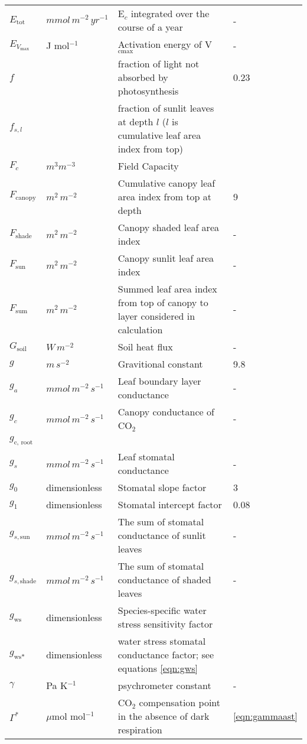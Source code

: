 \documentclass[10pt]{article}
\renewcommand{\marginnote}[2][]{}
\begin{document}
\begin{center}
\begin{longtable}{l l p{3in} p{0.5in}}
$E_\text{tot}$	&	$mmol\, m^{-2}\, yr^{-1}$	&	E$_c$ integrated over the course of a year	&	-	\\
$E_{V_\text{max}}$ & J mol$^{-1}$ & Activation energy of V$_\text{cmax}$& - \\
$f$ & & fraction of light not absorbed by photosynthesis & 0.23 \\
$f_{s,l}$ & & fraction of sunlit leaves at depth $l$ ($l$ is cumulative leaf area index from top) & \\
$F_c$ & $m^3m^{-3}$ & Field Capacity & \\
$F_{\text{canopy}}$	&	$m^2\, m^{-2}$	&Cumulative canopy leaf area index from top at depth	&	9	\\
$F_{\text{shade}}$	&	$m^2\, m^{-2}$	&	Canopy shaded leaf area index	&	-	\\
$F_{\text{sun}}$	&	$m^2\,m^{-2}$	&	Canopy sunlit leaf area index	&	-	\\
$F_{\text{sum}}$	&	$m^2\, m^{-2}$	&	Summed leaf area index from top of canopy to layer considered in calculation	&	-	\\
$G_{\text{soil}}$	&	$W\,m^{-2}$	&	Soil heat flux	&	-	\\
$g$	&	$m\, s^{-2}$	&	Gravitional constant	&	9.8	\\
$g_a$	&	$mmol\,m^{-2}\, s^{-1}$	&	Leaf boundary layer conductance	&	-	\\
$g_c$	&	$mmol\,m^{-2}\, s^{-1}$	&	Canopy conductance of CO$_2$ 	&	-	\\
$g_\text{c, root}$	&	& & \marginnote{undefined}\\
$g_s$	&	$mmol\,m^{-2}\, s^{-1}$	&	Leaf stomatal conductance	&	-	\\
$g_0$	&	dimensionless	&	Stomatal slope factor	&	3	\\
$g_1$	&	dimensionless	&	Stomatal intercept factor	&	0.08	\\
$g_{s,\text{sun}}$	&	$mmol\, m^{-2}\, s^{-1}$	&	The sum of stomatal conductance of sunlit leaves	&	-	\\
$g_{s,\text{shade}}$	&	$mmol\, m^{-2}\, s^{-1}$	&	The sum of stomatal conductance of shaded leaves	&	-	\\
$g_\text{ws}$ & dimensionless & Species-specific water stress sensitivity factor & \\
$g_\text{ws*}$ & dimensionless & water stress stomatal conductance factor; see equations \ref{eqn:gws} &\\
$\gamma$	&	Pa K$^{-1}$	&	psychrometer constant 	&	-	\\
$\Gamma^\ast$ & $\mu$mol mol$^{-1}$ & CO$_2$ compensation point in the absence of dark respiration & \ref{eqn:gammaast}\\

\end{longtable}
\end{center}
\end{document}
